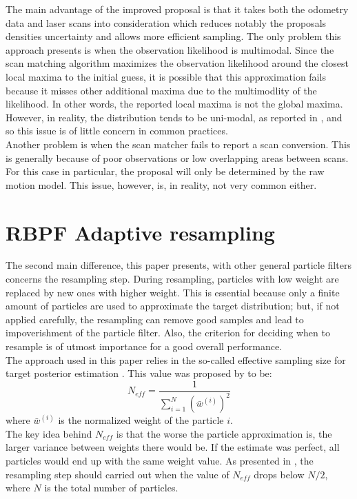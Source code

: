 \documentclass[letterpaper]{article}
\begin{document}
The main advantage of the improved proposal is that it takes both the odometry data and laser scans into consideration which reduces notably the proposals densities uncertainty and allows more efficient sampling. The only problem this approach presents is when the observation likelihood is multimodal. Since the scan matching algorithm maximizes the observation likelihood around the closest local maxima to the initial guess, it is possible that this approximation fails because it misses other additional maxima due to the multimodlity of the likelihood. In other words, the reported local maxima is not the global maxima. However, in reality, the distribution tends to be uni-modal, as reported in \cite{Cyrill}, and so this issue is of little concern in common practices.\\
Another problem is when the scan matcher fails to report a scan conversion. This is generally because of poor observations or low overlapping areas between scans. For this case in particular, the proposal will only be determined by the raw motion model. This issue, however, is, in reality, not very common either.

\section{RBPF Adaptive resampling}

The second main difference, this paper presents, with other general particle filters concerns the resampling step. During resampling, particles with low weight are replaced by new ones with higher weight. This is essential because only a finite amount of particles are used to approximate the target distribution; but, if not applied carefully, the resampling can remove good samples and lead to impoverishment of the particle filter. Also, the criterion for deciding when to resample is of utmost importance for a good overall performance.\\
The approach used in this paper relies in the so-called effective sampling size for target posterior estimation \cite{Liu}. This value was proposed by \cite{Weights} to be:
\begin{equation}
N_{eff}= \frac{1}{\sum_{i=1}^N (\bar w^{(i)})^2}
\end{equation}
where $\bar w^{(i)}$ is the normalized weight of the particle $i$.\\
The key idea behind $N_{eff}$ is that the worse the particle approximation is, the larger variance between weights there would be.  If the estimate was perfect, all particles would end up with the same weight value. As presented in \cite{Cyrill}, the resampling step should carried out when the value of $N_{eff}$ drops below $N/2$, where $N$ is the total number of particles.
\end{document}
